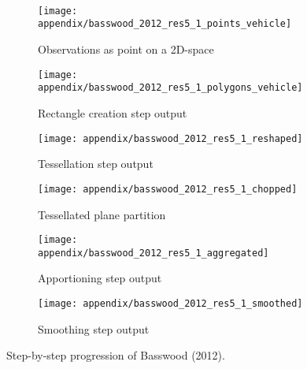 
\appendixtitle 
\appendix


\chapter{}

\begin{figure}\
  \begin{subfigure}[b]{0.49\textwidth}
    \centering
    \texttt{[image: appendix/basswood\_2012\_res5\_1\_points\_vehicle]}
    \caption{Observations as point on a 2D-space}
   \end{subfigure}
  \begin{subfigure}[b]{0.49\textwidth}
    \centering
    \texttt{[image: appendix/basswood\_2012\_res5\_1\_polygons\_vehicle]}
    \caption{Rectangle creation step output}
  \end{subfigure}
  \begin{subfigure}[b]{0.49\textwidth}
    \centering
    \texttt{[image: appendix/basswood\_2012\_res5\_1\_reshaped]}
    \caption{Tessellation step output}
  \end{subfigure}
  \begin{subfigure}[b]{0.49\textwidth}
    \centering
    \texttt{[image: appendix/basswood\_2012\_res5\_1\_chopped]}
    \caption{Tessellated plane partition}
   \end{subfigure}
  \begin{subfigure}[b]{0.49\textwidth}
    \centering
    \texttt{[image: appendix/basswood\_2012\_res5\_1\_aggregated]}
    \caption{Apportioning step output}
  \end{subfigure}
  \begin{subfigure}[b]{0.49\textwidth}
    \centering
    \texttt{[image: appendix/basswood\_2012\_res5\_1\_smoothed]}
    \caption{Smoothing step output}
  \end{subfigure}
  \caption[Step-by-step visualization of the algorithm for one
  field]{Step-by-step progression of Basswood (2012).}
  \label{fig:basswood2012-all-steps}
\end{figure}

